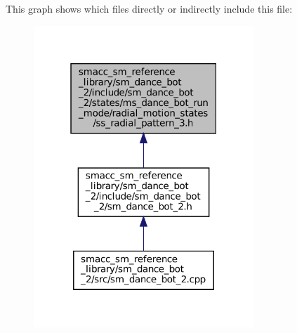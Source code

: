This graph shows which files directly or indirectly include this file\+:
\nopagebreak
\begin{figure}[H]
\begin{center}
\leavevmode
\includegraphics[width=235pt]{sm__dance__bot__2_2include_2sm__dance__bot__2_2states_2ms__dance__bot__run__mode_2radial__motiondce53fb1241a194487e0a91d664f2fab}
\end{center}
\end{figure}
